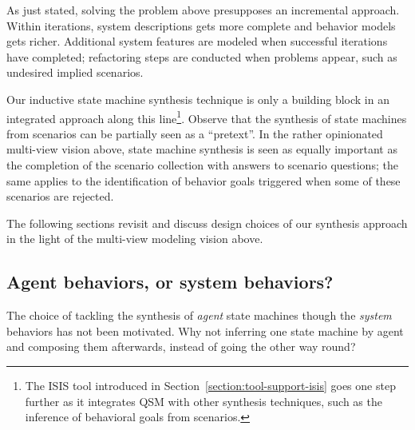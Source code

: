 As just stated, solving the problem above presupposes an incremental approach. Within iterations, system descriptions gets more complete and behavior models gets richer. Additional system features are modeled when successful iterations have completed; refactoring steps are conducted when problems appear, such as undesired implied scenarios.

Our inductive state machine synthesis technique is only a building block in an integrated approach along this line\footnote{The ISIS tool introduced in Section~\ref{section:tool-support-isis} goes one step further as it integrates QSM with other synthesis techniques, such as the inference of behavioral goals from scenarios.}. Observe that the synthesis of state machines from scenarios can be partially seen as a ``pretext''. In the rather opinionated multi-view vision above, state machine synthesis is seen as equally important as the completion of the scenario collection with answers to scenario questions; the same applies to the identification of behavior goals triggered when some of these scenarios are rejected.

The following sections revisit and discuss design choices of our synthesis approach in the light of the multi-view modeling vision above.

\subsection{Agent behaviors, or system behaviors?}

The choice of tackling the synthesis of \emph{agent} state machines though the \emph{system} behaviors has not been motivated. Why not inferring one state machine by agent and composing them afterwards, instead of going the other way round?

